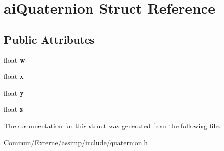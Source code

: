 \hypertarget{structai_quaternion}{}\section{ai\+Quaternion Struct Reference}
\label{structai_quaternion}
\subsection*{Public Attributes}
\begin{DoxyCompactItemize}
\item 
float {\bfseries w}\hypertarget{structai_quaternion_a410b3c46417d67d728a01a5810907a36}{}\label{structai_quaternion_a410b3c46417d67d728a01a5810907a36}

\item 
float {\bfseries x}\hypertarget{structai_quaternion_af9db21b086c14d8654d62005f740e75f}{}\label{structai_quaternion_af9db21b086c14d8654d62005f740e75f}

\item 
float {\bfseries y}\hypertarget{structai_quaternion_a1695fefbc60becf95fcafcc08573ab44}{}\label{structai_quaternion_a1695fefbc60becf95fcafcc08573ab44}

\item 
float {\bfseries z}\hypertarget{structai_quaternion_acc30da6103d5131fb1bed6640f1eeda0}{}\label{structai_quaternion_acc30da6103d5131fb1bed6640f1eeda0}

\end{DoxyCompactItemize}


The documentation for this struct was generated from the following file\+:\begin{DoxyCompactItemize}
\item 
Commun/\+Externe/assimp/include/\hyperlink{quaternion_8h}{quaternion.\+h}\end{DoxyCompactItemize}
